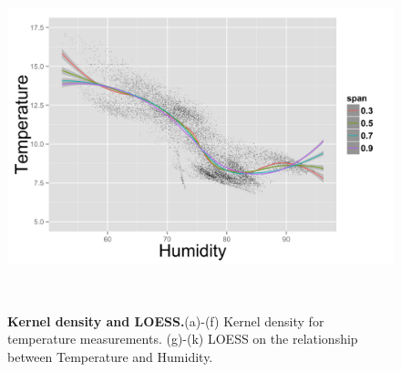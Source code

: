 \begin{figure}
\begin{minipage}[t]{0.33\textwidth}
  \end{minipage}
  \begin{minipage}[t]{0.34\textwidth}
    \centering
    \includegraphics[width=\textwidth,height=\textwidth]{fig/Humid_Temp_Loess_poly2.png}
  \end{minipage}\\
  \caption{\textbf{Kernel density and LOESS.}(a)-(f) Kernel density for temperature measurements. (g)-(k) LOESS on the relationship between Temperature and Humidity.}   
  \label{fig:Kernel_LOESS}
\end{figure}
